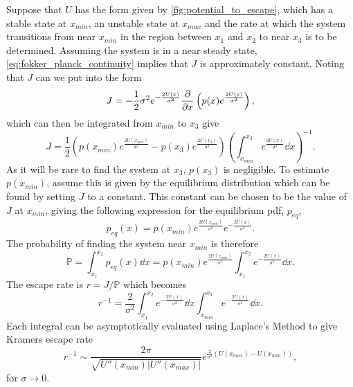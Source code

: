 Suppose that $U$ has the form given by \cref{fig:potential_to_escape}, which has a stable state at $x_{min}$, an unstable state at $x_{max}$ and the rate at which the system
transitions from near $x_{min}$ in the region between $x_1$ and $x_2$ to near $x_3$ is to be determined. Assuming the system is in a near steady state, \cref{eq:fokker_planck_continuity}
implies that $J$ is approximately constant. Noting that $J$ can we put into the form
\begin{equation}
  \label{eq:probability_current_other_form}
  J = -\frac{1}{2}\sigma^2 e^{-\frac{2U(x)}{\sigma^2}} \pdv{x} \left( p(x) e^{\frac{2U(x)}{\sigma^2}}\right),
\end{equation}
which can then be integrated from $x_{min}$ to $x_3$ give
\begin{equation}
  \label{eq:integrated_J}
  J = \frac{1}{2} \left(p(x_{min})e^{\frac{2U(x_{min})}{\sigma^2}} - p(x_3)e^{\frac{2U(x_{3})}{\sigma^2}}\right)\left(\int_{x_{min}}^{x_{3}} e^{\frac{2U(x)}{\sigma^2}} \dd{x}\right)^{-1}.
\end{equation}
As it will be rare to find the system at $x_3$, $p(x_3)$ is negligible. To estimate $p(x_{min})$, assume this is given by the equilibrium distribution which can be found by setting $J$ to
a constant. This constant can be chosen to be the value of $J$ at $x_{min}$, giving the following expression for the equilibrium pdf, $p_{eq}$,
\begin{equation}
  \label{eq:equilibrium_pdf}
  p_{eq}(x) = p(x_{min})e^{\frac{2U(x_{min})}{\sigma^2}}e^{-\frac{2U(x)}{\sigma^2}}.
\end{equation}
The probability of finding the system near $x_{min}$ is therefore
\begin{equation}
  \label{eq:p_near_xmin}
  \mathbb{P} = \int_{x_1}^{x_2} p_{eq}(x) \dd{x} = p(x_{min})e^{\frac{2U(x_{min})}{\sigma^2}} \int_{x_1}^{x_2} e^{-\frac{2U(x)}{\sigma^2}} \dd{x}.
\end{equation}
The escape rate is $r = J/\mathbb{P}$ which becomes
\begin{equation}
  \label{eq:escape_rate_integrals}
  r^{-1} = \frac{2}{\sigma^2} \int_{x_1}^{x_2} e^{-\frac{2U(x)}{\sigma^2}} \dd{x} \int_{x_{min}}^{x_3} e^{-\frac{2U(x)}{\sigma^2}} \dd{x}.
\end{equation}
Each integral can be asymptotically evaluated using Laplace's Method \parencite{Bender1978} to give Kramers escape rate
\begin{equation}
  \label{eq:kramers}
  r^{-1} \sim \frac{2\pi}{\sqrt{U''(x_{min})|U''(x_{max})|}} e^{\frac{2}{\sigma^2}\left(U(x_{max})-U(x_{min})\right)},
\end{equation}
for $ \sigma \rightarrow 0$.

